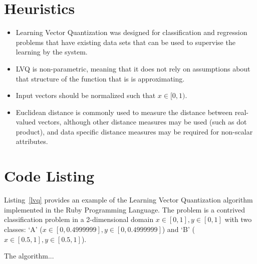 \documentclass[a4paper, 11pt]{article}
\begin{document}
\section{Heuristics}
\label{sec:heuristics}
\begin{itemize}
	\item Learning Vector Quantization was designed for classification and regression problems that have existing data sets that can be used to supervise the learning by the system.
	\item LVQ is non-parametric, meaning that it does not rely on assumptions about that structure of the function that is is approximating.
	\item Input vectors should be normalized such that $x \in [0,1)$. 
	\item Euclidean distance is commonly used to measure the distance between real-valued vectors, although other distance measures may be used (such as dot product), and data specific distance measures may be required for non-scalar attributes.
\end{itemize}

\section{Code Listing}
\label{sec:code}
Listing~\ref{lvq} provides an example of the Learning Vector Quantization algorithm implemented in the Ruby Programming Language. 
The problem is a contrived classification problem in a 2-dimensional domain $x\in[0,1], y\in[0,1]$ with two classes: `A' ($x\in[0,0.4999999], y\in[0,0.4999999]$) and `B' ($x\in[0.5,1], y\in[0.5,1]$).

The algorithm...
\end{document}
